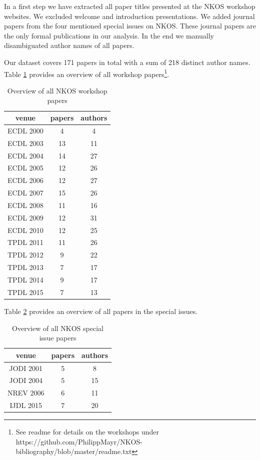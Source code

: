 \documentclass[runningheads,a4paper]{llncs}
\begin{document}
In a first step we have extracted all paper titles presented at the NKOS workshop websites. We excluded welcome and introduction presentations. We added journal papers from the four mentioned special issues on NKOS. These journal papers are the only formal publications in our analysis. In the end we manually disambiguated author names of all papers.

Our dataset covers 171 papers in total with a sum of 218 distinct author names. Table \ref{tab:workshops} provides an overview of all workshop papers\footnote{See readme for details on the workshops under https://github.com/PhilippMayr/NKOS-bibliography/blob/master/readme.txt}.

\begin{table}
	\centering
	\caption{Overview of all NKOS workshop papers}
\begin{tabular}	{|c|c|c|}		
	\hline 
	venue& papers  & authors  \\ 
	\hline 
	ECDL 2000& 4 & 4 \\ 
	\hline 
	ECDL 2003& 13 & 11 \\ 
	\hline 
	ECDL 2004& 14 & 27 \\ 
	\hline 
	ECDL 2005& 12 & 26 \\ 
	\hline 
	ECDL 2006& 12 & 27 \\ 
	\hline 
	ECDL 2007& 15 & 26 \\ 
	\hline 
	ECDL 2008& 11 & 16 \\ 
	\hline 
	ECDL 2009& 12 & 31 \\ 
	\hline 
	ECDL 2010& 12 & 25 \\ 
	\hline 
	TPDL 2011& 11 & 26 \\ 
	\hline 
	TPDL 2012& 9 & 22 \\ 
	\hline 
	TPDL 2013& 7 & 17 \\ 
	\hline 
	TPDL 2014& 9 & 17 \\ 
	\hline 
	TPDL 2015& 7 & 13 \\ 
	\hline 
\end{tabular} 
\label{tab:workshops}
\end{table}


Table \ref{tab:SI} provides an overview of all papers in the special issues. 

\begin{table}
	\centering
	\caption{Overview of all NKOS special issue papers}
\begin{tabular}{|c|c|c|}  
	\hline 
	venue& papers  & authors  \\ 
	\hline 
	JODI 2001 \cite{Hill2001} & 5 & 8 \\ 
	\hline 
	JODI 2004 \cite{Tudhope2004} & 5 & 15 \\ 
	\hline 
	NREV 2006 \cite{Tudhope2006} & 6 & 11 \\ 
	\hline 
	IJDL 2015 \cite{Mayr2016} & 7 &  20\\ 
	\hline 
\end{tabular} 
\label{tab:SI}
\end{table}
\end{document}
